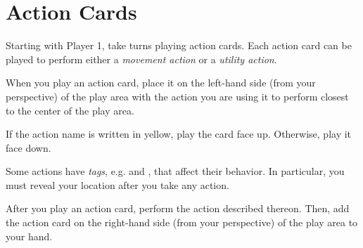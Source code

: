 \section*{Action Cards}
Starting with Player 1, take turns playing action cards.
Each action card can be played to perform either a \emph{movement action} or a \emph{utility action}.

When you play an action card, place it on the left-hand side (from your perspective) of the play area with the action you are using it to perform closest to the center of the play area.

If the action name is written in yellow, play the card face up. Otherwise, play it face down.

Some actions have \emph{tags}, e.g.  \LOUD{} and \QUIET{}, that affect their behavior. In particular, you must reveal your location after you take any \LOUD{} action.

After you play an action card, perform the action described thereon.
Then, add the action card on the right-hand side (from your perspective) of the play area to your hand.
